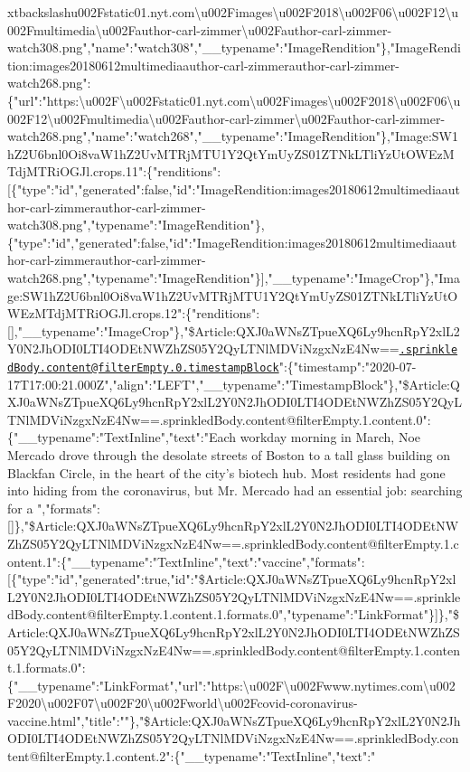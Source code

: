 xtbackslash{}u002Fstatic01.nyt.com\textbackslash{}u002Fimages\textbackslash{}u002F2018\textbackslash{}u002F06\textbackslash{}u002F12\textbackslash{}u002Fmultimedia\textbackslash{}u002Fauthor-carl-zimmer\textbackslash{}u002Fauthor-carl-zimmer-watch308.png","name":"watch308","\_\_typename":"ImageRendition"\},"ImageRendition:images20180612multimediaauthor-carl-zimmerauthor-carl-zimmer-watch268.png":\{"url":"https:\textbackslash{}u002F\textbackslash{}u002Fstatic01.nyt.com\textbackslash{}u002Fimages\textbackslash{}u002F2018\textbackslash{}u002F06\textbackslash{}u002F12\textbackslash{}u002Fmultimedia\textbackslash{}u002Fauthor-carl-zimmer\textbackslash{}u002Fauthor-carl-zimmer-watch268.png","name":"watch268","\_\_typename":"ImageRendition"\},"Image:SW1hZ2U6bnl0Oi8vaW1hZ2UvMTRjMTU1Y2QtYmUyZS01ZTNkLTliYzUtOWEzMTdjMTRiOGJl.crops.11":\{"renditions":{[}\{"type":"id","generated":false,"id":"ImageRendition:images20180612multimediaauthor-carl-zimmerauthor-carl-zimmer-watch308.png","typename":"ImageRendition"\},\{"type":"id","generated":false,"id":"ImageRendition:images20180612multimediaauthor-carl-zimmerauthor-carl-zimmer-watch268.png","typename":"ImageRendition"\}{]},"\_\_typename":"ImageCrop"\},"Image:SW1hZ2U6bnl0Oi8vaW1hZ2UvMTRjMTU1Y2QtYmUyZS01ZTNkLTliYzUtOWEzMTdjMTRiOGJl.crops.12":\{"renditions":{[}{]},"\_\_typename":"ImageCrop"\},"\$Article:QXJ0aWNsZTpueXQ6Ly9hcnRpY2xlL2Y0N2JhODI0LTI4ODEtNWZhZS05Y2QyLTNlMDViNzgxNzE4Nw==\href{mailto:.sprinkledBody.content@filterEmpty.0.timestampBlock}{\nolinkurl{.sprinkledBody.content@filterEmpty.0.timestampBlock}}":\{"timestamp":"2020-07-17T17:00:21.000Z","align":"LEFT","\_\_typename":"TimestampBlock"\},"\$Article:QXJ0aWNsZTpueXQ6Ly9hcnRpY2xlL2Y0N2JhODI0LTI4ODEtNWZhZS05Y2QyLTNlMDViNzgxNzE4Nw==.sprinkledBody.content@filterEmpty.1.content.0":\{"\_\_typename":"TextInline","text":"Each
workday morning in March, Noe Mercado drove through the desolate streets
of Boston to a tall glass building on Blackfan Circle, in the heart of
the city's biotech hub. Most residents had gone into hiding from the
coronavirus, but Mr. Mercado had an essential job: searching for a
","formats":{[}{]}\},"\$Article:QXJ0aWNsZTpueXQ6Ly9hcnRpY2xlL2Y0N2JhODI0LTI4ODEtNWZhZS05Y2QyLTNlMDViNzgxNzE4Nw==.sprinkledBody.content@filterEmpty.1.content.1":\{"\_\_typename":"TextInline","text":"vaccine","formats":{[}\{"type":"id","generated":true,"id":"\$Article:QXJ0aWNsZTpueXQ6Ly9hcnRpY2xlL2Y0N2JhODI0LTI4ODEtNWZhZS05Y2QyLTNlMDViNzgxNzE4Nw==.sprinkledBody.content@filterEmpty.1.content.1.formats.0","typename":"LinkFormat"\}{]}\},"\$Article:QXJ0aWNsZTpueXQ6Ly9hcnRpY2xlL2Y0N2JhODI0LTI4ODEtNWZhZS05Y2QyLTNlMDViNzgxNzE4Nw==.sprinkledBody.content@filterEmpty.1.content.1.formats.0":\{"\_\_typename":"LinkFormat","url":"https:\textbackslash{}u002F\textbackslash{}u002Fwww.nytimes.com\textbackslash{}u002F2020\textbackslash{}u002F07\textbackslash{}u002F20\textbackslash{}u002Fworld\textbackslash{}u002Fcovid-coronavirus-vaccine.html","title":""\},"\$Article:QXJ0aWNsZTpueXQ6Ly9hcnRpY2xlL2Y0N2JhODI0LTI4ODEtNWZhZS05Y2QyLTNlMDViNzgxNzE4Nw==.sprinkledBody.content@filterEmpty.1.content.2":\{"\_\_typename":"TextInline","text":"
